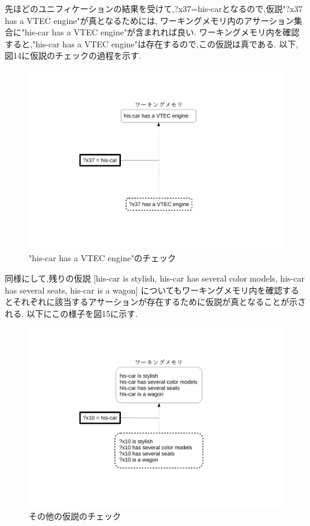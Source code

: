 \documentclass[uplatex,12pt]{jsarticle}
\begin{document}
先ほどのユニフィケーションの結果を受けて,?x37=his-carとなるので,仮説"?x37 has a VTEC engine"が真となるためには,
ワーキングメモリ内のアサーション集合に"his-car has a VTEC engine"が含まれれば良い.
ワーキングメモリ内を確認すると,"his-car has a VTEC engine"は存在するので,この仮説は真である.
以下,図14に仮説のチェックの過程を示す.
\begin{figure}[!hbt]
    \centering
    \includegraphics[scale=0.30]{images/backward_chaining_10.pdf}
    \caption{"his-car has a VTEC engine"のチェック}
\end{figure}

\newpage

同様にして,残りの仮説
[his-car is stylish, his-car has several color models, his-car has several seats, his-car is a wagon]
についてもワーキングメモリ内を確認するとそれぞれに該当するアサーションが存在するために仮説が真となることが示される.
以下にこの様子を図15に示す.
\begin{figure}[!hbt]
    \centering
    \includegraphics[scale=0.30]{images/backward_chaining_11.pdf}
    \caption{その他の仮説のチェック}
\end{figure}
\end{document}

